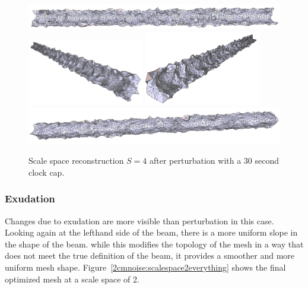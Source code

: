 \documentclass[12pt]{drexelthesis}
\let\Oldsubsubsection\subsubsection
\renewcommand{\subsubsection}{\FloatBarrier\Oldsubsubsection}
\begin{document}
\begin{figure}[!ht]
	\centering
		\includegraphics[width=5in]{simulated-lab-scan/2cmnoise/optimizedNeat/scalespace4perturb00.png}
		\includegraphics[width=2in]{simulated-lab-scan/2cmnoise/optimizedNeat/scalespace4perturb01.png}
		\includegraphics[width=2in]{simulated-lab-scan/2cmnoise/optimizedNeat/scalespace4perturb02.png}
		\includegraphics[width=5in]{simulated-lab-scan/2cmnoise/optimizedNeat/scalespace4perturb03.png}
		\caption[Scale space reconstruction $S = 4$ after perturbation with a 30 second clock cap]{\centering Scale space reconstruction $S = 4$ after perturbation with a 30 second clock cap.}
	\label{2cmnoise:scalespace4perturb}
\end{figure}




\subsubsection{Exudation}

Changes due to exudation are more visible than perturbation in this case. Looking again at the lefthand side of the beam, there is a more uniform slope in the shape of the beam. while this modifies the topology of the mesh in a way that does not meet the true definition of the beam, it provides a smoother and more uniform mesh shape. Figure~\ref{2cmnoise:scalespace2everything} shows the final optimized mesh at a scale space of 2.
\end{document}
